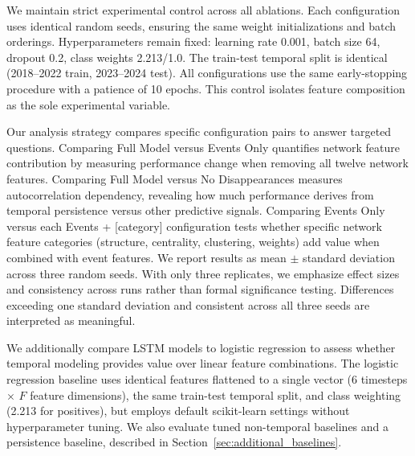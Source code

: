 \documentclass[pdflatex,sn-mathphys-num]{sn-jnl}%
\theoremstyle{thmstyleone}%
\theoremstyle{thmstyletwo}%
\theoremstyle{thmstylethree}%
\begin{document}
We maintain strict experimental control across all ablations. Each configuration uses identical random seeds, ensuring the same weight initializations and batch orderings. Hyperparameters remain fixed: learning rate 0.001, batch size 64, dropout 0.2, class weights 2.213/1.0. The train-test temporal split is identical (2018--2022 train, 2023--2024 test). All configurations use the same early-stopping procedure with a patience of 10 epochs. This control isolates feature composition as the sole experimental variable.

Our analysis strategy compares specific configuration pairs to answer targeted questions. Comparing Full Model versus Events Only quantifies network feature contribution by measuring performance change when removing all twelve network features. Comparing Full Model versus No Disappearances measures autocorrelation dependency, revealing how much performance derives from temporal persistence versus other predictive signals. Comparing Events Only versus each Events + [category] configuration tests whether specific network feature categories (structure, centrality, clustering, weights) add value when combined with event features. We report results as mean $\pm$ standard deviation across three random seeds. With only three replicates, we emphasize effect sizes and consistency across runs rather than formal significance testing. Differences exceeding one standard deviation and consistent across all three seeds are interpreted as meaningful.

We additionally compare LSTM models to logistic regression to assess whether temporal modeling provides value over linear feature combinations. The logistic regression baseline uses identical features flattened to a single vector (6 timesteps $\times$ $F$ feature dimensions), the same train-test temporal split, and class weighting (2.213 for positives), but employs default scikit-learn settings without hyperparameter tuning. We also evaluate tuned non-temporal baselines and a persistence baseline, described in Section~\ref{sec:additional_baselines}.
\end{document}
